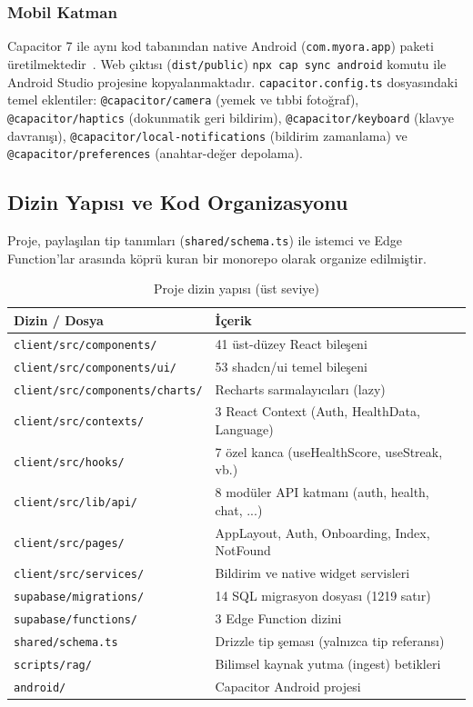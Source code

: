 \subsubsection{Mobil Katman}

Capacitor 7 ile aynı kod tabanından native Android (\texttt{com.myora.app}) paketi üretilmektedir~\cite{Capacitor2024}. Web çıktısı (\texttt{dist/public}) \texttt{npx cap sync android} komutu ile Android Studio projesine kopyalanmaktadır. \texttt{capacitor.config.ts} dosyasındaki temel eklentiler: \texttt{@capacitor/camera} (yemek ve tıbbi fotoğraf), \texttt{@capacitor/haptics} (dokunmatik geri bildirim), \texttt{@capacitor/keyboard} (klavye davranışı), \texttt{@capacitor/local-notifications} (bildirim zamanlama) ve \texttt{@capacitor/preferences} (anahtar-değer depolama).

\subsection{Dizin Yapısı ve Kod Organizasyonu}

Proje, paylaşılan tip tanımları (\texttt{shared/schema.ts}) ile istemci ve Edge Function'lar arasında köprü kuran bir monorepo olarak organize edilmiştir.

\begin{table}[H]
\centering
\caption{Proje dizin yapısı (üst seviye)}
\label{tab:dir_structure}
\begin{tabular}{|l|l|}
\hline
\textbf{Dizin / Dosya} & \textbf{İçerik} \\
\hline
\texttt{client/src/components/}    & 41 üst-düzey React bileşeni \\
\texttt{client/src/components/ui/} & 53 shadcn/ui temel bileşeni \\
\texttt{client/src/components/charts/} & Recharts sarmalayıcıları (lazy) \\
\texttt{client/src/contexts/}      & 3 React Context (Auth, HealthData, Language) \\
\texttt{client/src/hooks/}         & 7 özel kanca (useHealthScore, useStreak, vb.) \\
\texttt{client/src/lib/api/}       & 8 modüler API katmanı (auth, health, chat, ...) \\
\texttt{client/src/pages/}         & AppLayout, Auth, Onboarding, Index, NotFound \\
\texttt{client/src/services/}      & Bildirim ve native widget servisleri \\
\texttt{supabase/migrations/}      & 14 SQL migrasyon dosyası (1219 satır) \\
\texttt{supabase/functions/}       & 3 Edge Function dizini \\
\texttt{shared/schema.ts}          & Drizzle tip şeması (yalnızca tip referansı) \\
\texttt{scripts/rag/}              & Bilimsel kaynak yutma (ingest) betikleri \\
\texttt{android/}                  & Capacitor Android projesi \\
\hline
\end{tabular}
\end{table}

